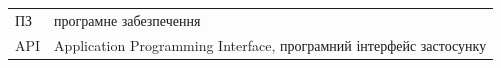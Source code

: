 %
%

\begin{tabularx}{\textwidth}{@{}l X@{}}
  ПЗ & програмне забезпечення \\
  API & Application Programming Interface, програмний інтерфейс застосунку \\
\end{tabularx}
